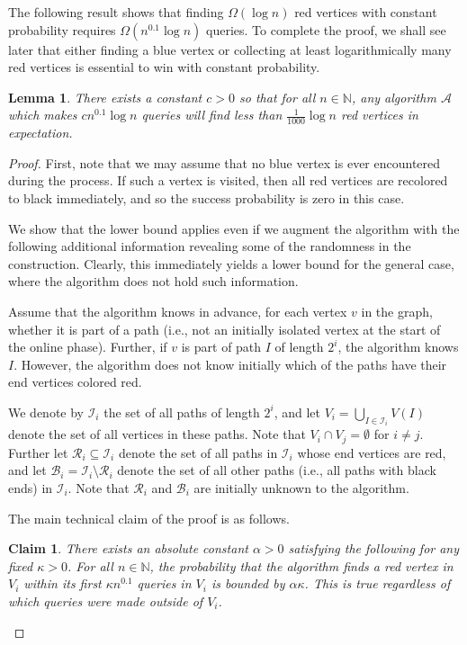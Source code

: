 \documentclass[11pt]{article}
\numberwithin{equation}{section}
\newtheorem{lemma}[lemma]{Lemma}
\newtheorem{claim}[claim]{Claim}
\newcommand{\N}{\mathbb N}
\newcommand{\1}{\mathbf{1}}
\newcommand{\A}{\mathcal A}
\begin{document}
The following result shows that finding $\Omega(\log n)$ red vertices with constant probability requires $\Omega(n^{0.1} \log n)$ queries. To complete the proof, we shall see later that either finding a blue vertex or collecting at least logarithmically many red vertices is essential to win with constant probability.

\begin{lemma}
\label{lem:collision_red_vtxs}
There exists a constant $c > 0$ so that for all $n \in \N$, any algorithm $\A$ which makes $c n^{0.1}\log n$ queries will find less than $\frac{1}{1000}\log n$ red vertices in expectation.
\end{lemma}

\begin{proof}
First, note that we may assume that no blue vertex is ever encountered during the process. If such a vertex is visited, then all red vertices are recolored to black immediately, and so the success probability is zero in this case.

We show that the lower bound applies even if we augment the algorithm with the following additional information revealing some of the randomness in the construction. Clearly, this immediately yields a lower bound for the general case, where the algorithm does not hold such information.

Assume that the algorithm knows in advance, for each vertex $v$ in the graph, whether it is part of a path (i.e., not an initially isolated vertex at the start of the online phase). Further, if $v$ is part of path $I$ of length $2^i$, the algorithm knows $I$. However, the algorithm does not know initially which of the paths have their end vertices colored red.

We denote by $\mathcal{I}_i$ the set of all paths of length $2^i$, and let $V_i = \bigcup_{I \in \mathcal{I}_i} V(I)$ denote the set of all vertices in these paths. Note that $V_i \cap V_j = \emptyset$ for $i \neq j$.
Further let $\mathcal{R}_i \subseteq \mathcal{I}_i$ denote the set of all paths in $\mathcal{I}_i$ whose end vertices are red, and let $\mathcal{B}_i = \mathcal{I}_i \setminus \mathcal{R}_i$ denote the set of all other paths (i.e., all paths with black ends) in $\mathcal{I}_i$. Note that $\mathcal{R}_i$ and $\mathcal{B}_i$ are initially unknown to the algorithm.

The main technical claim of the proof is as follows.
\begin{claim}
\label{claim:single_length}
There exists an absolute constant $\alpha > 0$ satisfying the following for any fixed $\kappa > 0$. For all $n \in \N$, the probability that the algorithm finds a red vertex in $V_i$ within its first $\kappa n^{0.1}$ queries in $V_i$ is bounded by $\alpha \kappa$. This is true regardless of which queries were made outside of $V_i$.
\end{claim}


\end{proof}
\end{document}
